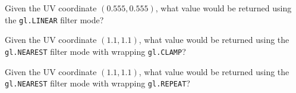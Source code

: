 \documentclass[11pt]{article}
\begin{document}
\begin{enumerate}[start=0]
Given the UV coordinate $(0.555, 0.555)$, what value would be returned using the \texttt{gl.LINEAR} filter mode?
\vspace*{55px}

Given the UV coordinate $(1.1, 1.1)$, what value would be returned using the \texttt{gl.NEAREST} filter mode with wrapping \texttt{gl.CLAMP}?
\vspace*{55px}

Given the UV coordinate $(1.1, 1.1)$, what value would be returned using the \texttt{gl.NEAREST} filter mode with wrapping \texttt{gl.REPEAT}?


\end{enumerate}
\end{document}

